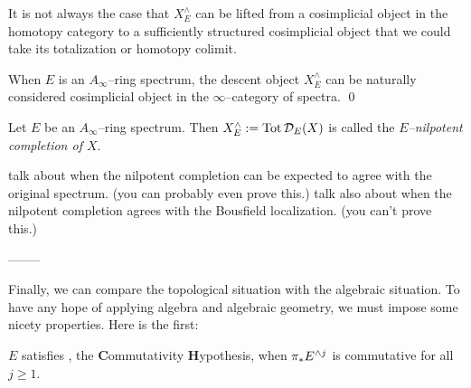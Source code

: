 It is not always the case that $X^\wedge_E$ can be lifted from a cosimplicial object in the homotopy category to a sufficiently structured cosimplicial object that we could take its totalization or homotopy colimit.
\begin{lemma}
When $E$ is an $A_\infty$--ring spectrum, the descent object $X^\wedge_E$ can be naturally considered cosimplicial object in the $\infty$--category of spectra. \qed {}
\end{lemma}
\begin{definition}
Let $E$ be an $A_\infty$--ring spectrum.  Then $X^\wedge_E := \operatorname{Tot} \mathcal{D}_E(X)$ is called the \textit{$E$--nilpotent completion of $X$}.
\end{definition}



talk about when the nilpotent completion can be expected to agree with the original spectrum.  (you can probably even prove this.)  talk also about when the nilpotent completion agrees with the Bousfield localization.  (you can't prove this.)

--------

Finally, we can compare the topological situation with the algebraic situation.  To have any hope of applying algebra and algebraic geometry, we must impose some nicety properties.  Here is the first:

\begin{definition}
$E$ satisfies \CH, the \textbf Commutativity \textbf Hypothesis, when $\pi_* E^{\wedge j}$ is commutative for all $j \ge 1$.
\end{definition}


